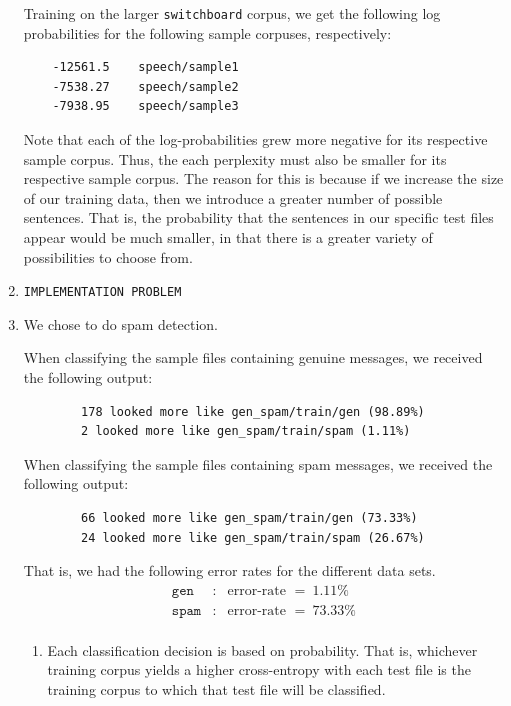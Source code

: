 \documentclass[11pt]{article}
\begin{document}
\begin{enumerate}
	Training on the larger \texttt{switchboard} corpus, we get the following log probabilities for the following sample corpuses, respectively:
	\begin{lstlisting}
	-12561.5    speech/sample1
	-7538.27    speech/sample2
	-7938.95    speech/sample3
	\end{lstlisting}
	Note that each of the log-probabilities grew more negative for its respective sample corpus. Thus, the each perplexity must also be smaller for its respective sample corpus. The reason for this is because if we increase the size of our training data, then we introduce a greater number of possible sentences. That is, the probability that the sentences in our specific test files appear would be much smaller, in that there is a greater variety of possibilities to choose from.

\item %
	\texttt{IMPLEMENTATION PROBLEM}
	
\item %
	We chose to do spam detection.

	When classifying the sample files containing genuine messages, we received the following output:
	\begin{lstlisting}
		178 looked more like gen_spam/train/gen (98.89%)
		2 looked more like gen_spam/train/spam (1.11%)
	\end{lstlisting}
	When classifying the sample files containing spam messages, we received the following output:
	\begin{lstlisting}
		66 looked more like gen_spam/train/gen (73.33%)
		24 looked more like gen_spam/train/spam (26.67%)
	\end{lstlisting}

	That is, we had the following error rates for the different data sets.
	\begin{eqnarray*}
		\texttt{gen} &\colon& \text{error-rate } = \ 1.11\% \\
		\texttt{spam} &\colon& \text{error-rate } = \ 73.33\% \\
	\end{eqnarray*}

	\begin{enumerate}[label=(\alph*)]
	\item %
		Each classification decision is based on probability. That is, whichever training corpus yields a higher cross-entropy with each test file is the training corpus to which that test file will be classified. 


\end{enumerate}
\end{enumerate}
\end{document}
